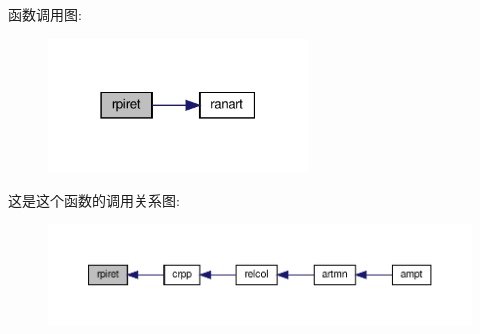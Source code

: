 函数调用图\+:
\nopagebreak
\begin{figure}[H]
\begin{center}
\leavevmode
\includegraphics[width=195pt]{rpiret_8f90_af59b6f041526aba771e73746b2ee508e_cgraph}
\end{center}
\end{figure}
这是这个函数的调用关系图\+:
\nopagebreak
\begin{figure}[H]
\begin{center}
\leavevmode
\includegraphics[width=350pt]{rpiret_8f90_af59b6f041526aba771e73746b2ee508e_icgraph}
\end{center}
\end{figure}
